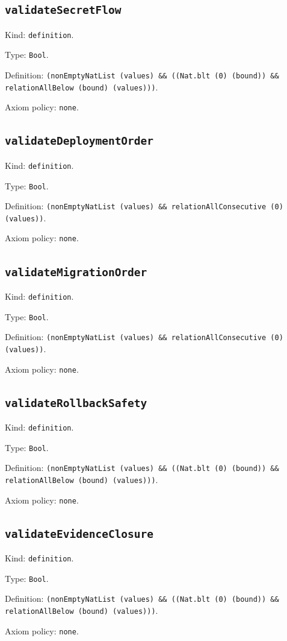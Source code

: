\documentclass[11pt]{article}
\begin{document}
\subsection*{\texttt{validateSecretFlow}}
\noindent Kind: \texttt{definition}.\par
\noindent Type: \texttt{Bool}.\par
\noindent Definition: \texttt{(nonEmptyNatList (values) \&\& ((Nat.blt (0) (bound)) \&\& relationAllBelow (bound) (values)))}.\par
\noindent Axiom policy: \texttt{none}.\par
\subsection*{\texttt{validateDeploymentOrder}}
\noindent Kind: \texttt{definition}.\par
\noindent Type: \texttt{Bool}.\par
\noindent Definition: \texttt{(nonEmptyNatList (values) \&\& relationAllConsecutive (0) (values))}.\par
\noindent Axiom policy: \texttt{none}.\par
\subsection*{\texttt{validateMigrationOrder}}
\noindent Kind: \texttt{definition}.\par
\noindent Type: \texttt{Bool}.\par
\noindent Definition: \texttt{(nonEmptyNatList (values) \&\& relationAllConsecutive (0) (values))}.\par
\noindent Axiom policy: \texttt{none}.\par
\subsection*{\texttt{validateRollbackSafety}}
\noindent Kind: \texttt{definition}.\par
\noindent Type: \texttt{Bool}.\par
\noindent Definition: \texttt{(nonEmptyNatList (values) \&\& ((Nat.blt (0) (bound)) \&\& relationAllBelow (bound) (values)))}.\par
\noindent Axiom policy: \texttt{none}.\par
\subsection*{\texttt{validateEvidenceClosure}}
\noindent Kind: \texttt{definition}.\par
\noindent Type: \texttt{Bool}.\par
\noindent Definition: \texttt{(nonEmptyNatList (values) \&\& ((Nat.blt (0) (bound)) \&\& relationAllBelow (bound) (values)))}.\par
\noindent Axiom policy: \texttt{none}.\par
\end{document}
